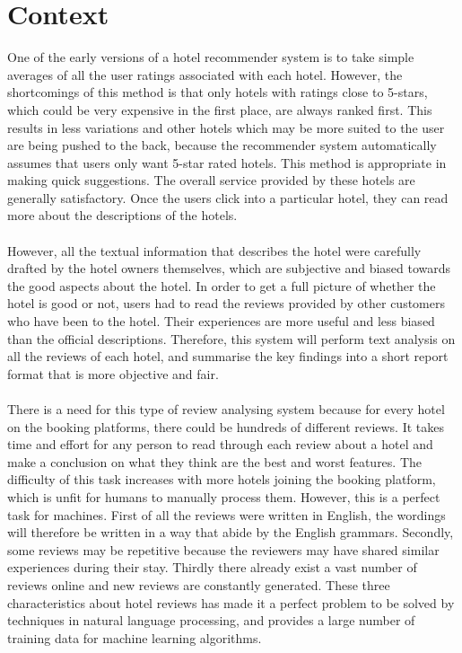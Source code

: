 \documentclass[a4paper]{report}
\begin{document}
\chapter{Context}
One of the early versions of a hotel recommender system is to take simple averages of all the user ratings associated with each hotel. However, the shortcomings of this method is that only hotels with ratings close to 5-stars, which could be very expensive in the first place, are always ranked first. This results in less variations and other hotels which may be more suited to the user are being pushed to the back, because the recommender system automatically assumes that users only want 5-star rated hotels. This method is appropriate in making quick suggestions. The overall service provided by these hotels are generally satisfactory. Once the users click into a particular hotel, they can read more about the descriptions of the hotels.
\\\\
However, all the textual information that describes the hotel were carefully drafted by the hotel owners themselves, which are subjective and biased towards the good aspects about the hotel. In order to get a full picture of whether the hotel is good or not, users had to read the reviews provided by other customers who have been to the hotel. Their experiences are more useful and less biased than the official descriptions. Therefore, this system will perform text analysis on all the reviews of each hotel, and summarise the key findings into a short report format that is more objective and fair.
\\\\
There is a need for this type of review analysing system because for every hotel on the booking platforms, there could be hundreds of different reviews. It takes time and effort for any person to read through each review about a hotel and make a conclusion on what they think are the best and worst features. The difficulty of this task increases with more hotels joining the booking platform, which is unfit for humans to manually process them. However, this is a perfect task for machines. First of all the reviews were written in English, the wordings will therefore be written in a way that abide by the English grammars. Secondly, some reviews may be repetitive because the reviewers may have shared similar experiences during their stay. Thirdly there already exist a vast number of reviews online and new reviews are constantly generated. These three characteristics about hotel reviews has made it a perfect problem to be solved by techniques in natural language processing, and provides a large number of training data for machine learning algorithms.
\end{document}
